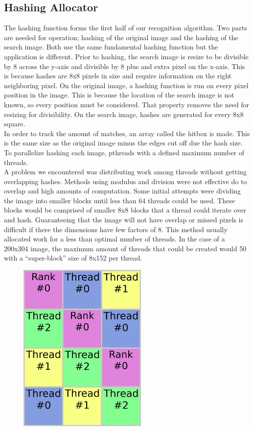 \documentclass[10pt, journal]{vgtc}                %
\begin{document}
\subsection{Hashing Allocator}
\begin{flushleft}
The hashing function forms the first half of our recognition algorithm. Two parts are needed for operation; hashing of the original image and the hashing of the search image. Both use the same fundamental hashing function but the application is different. Prior to hashing, the search image is resize to be divisible by 8 across the y-axis and divisible by 8 plus and extra pixel on the x-axis. This is because hashes are 8x8 pixels in size and require information on the right neighboring pixel. On the original image, a hashing function is run on every pixel position in the image. This is because the location of the search image is not known, so every position must be considered. That property removes the need for resizing for divisibility. On the search image, hashes are generated for every 8x8 square.\\\smallskip
In order to track the amount of matches, an array called the hitbox is made. This is the same size as the original image minus the edges cut off due the hash size. To parallelize hashing each image, pthreads with a defined maximum number of threads.\\\smallskip
A problem we encountered was distributing work among threads without getting overlapping hashes. Methods using modulus and division were not effective do to overlap and high amounts of computation. Some initial attempts were dividing the image into smaller blocks until less than 64 threads could be used. These blocks would be comprised of smaller 8x8 blocks that a thread could iterate over and hash. Guaranteeing that the image will not have overlap or missed pixels is difficult if there the dimensions have few factors of 8. This method usually allocated work for a less than optimal number of threads. In the case of a 200x304 image, the maximum amount of threads that could be created would 50 with a “super-block” size of 8x152 per thread.\\\smallskip
\begin{figure}[h!]
	\centering
	\includegraphics[width=2.5in]{thread_visualization.png}

\end{figure}
\end{flushleft}
\end{document}
